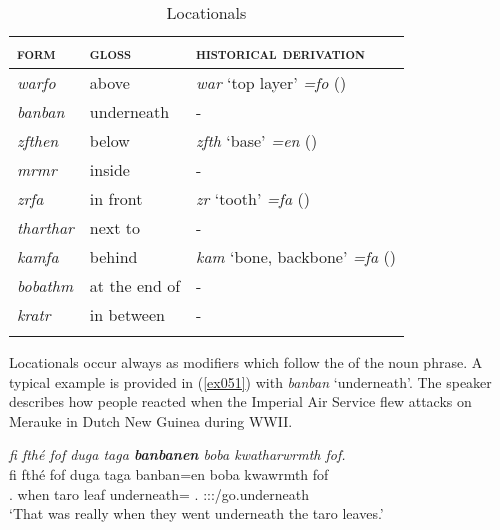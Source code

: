 \begin{table}
\caption{Locationals}
\label{locationaltable}
	\begin{tabular}{lll}
		\lsptoprule
		\textsc{form}&\textsc{gloss}&\textsc{historical derivation}\\ \midrule
		\emph{warfo}&above&\emph{war} `top layer' \emph{=fo} (\All{})\\
		\emph{banban}&underneath&-\\
		\emph{zfthen}&below&\emph{zfth} `base' \emph{=en} (\Loc{})\\
		\emph{mrmr}&inside&-\\
		\emph{zrfa}&in front&\emph{zr} `tooth' \emph{=fa} (\Abl{})\\
		\emph{tharthar}&next to&-\\
		\emph{kamfa}&behind&\emph{kam} `bone, backbone' \emph{=fa} (\Abl{})\\
		\emph{bobathm}&at the end of&-\\
		\emph{kratr}&in between&-\\
		\lspbottomrule
	\end{tabular}
\end{table}%

Locationals occur always as modifiers which follow the  of the noun phrase. A typical example is provided in (\ref{ex051}) with \emph{banban} `underneath'. The speaker describes how people reacted when the Imperial  Air Service flew attacks on Merauke in Dutch New Guinea during WWII.\\

\begin{exe}
	\ex \emph{fi fthé fof duga taga \textbf{banbanen} boba kwatharwrmth fof.}\\
	\gll fi fthé fof duga taga banban=en boba kwawrmth fof\\
	\Tsg.\Abs{} when \Emph{} taro leaf underneath=\Loc{} \Med.\Abl{} \Stpl:\Sbj:\Pst:\Dur/go.underneath \Emph{}\\
	\trans `That was really when they went underneath the taro leaves.'\\
	\label{ex051}
\end{exe}

